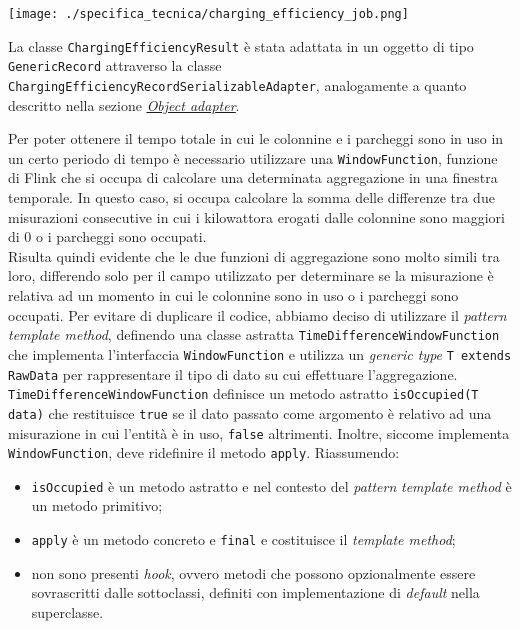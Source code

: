 \begin{center}
	\texttt{[image: ./specifica\_tecnica/charging\_efficiency\_job.png]}
\end{center}

La classe \texttt{ChargingEfficiencyResult} è stata adattata in un oggetto di tipo \texttt{GenericRecord} attraverso la classe \texttt{ChargingEfficiencyRecordSerializableAdapter},
analogamente a quanto descritto nella sezione \hyperref[object_adapter]{\underline{\textit{Object adapter}}}.

Per poter ottenere il tempo totale in cui le colonnine e i parcheggi sono in uso in un certo periodo di tempo è necessario utilizzare una \texttt{WindowFunction},
funzione di Flink che si occupa di calcolare una determinata aggregazione in una finestra temporale. In questo caso, si occupa calcolare la somma delle differenze
tra due misurazioni consecutive in cui i kilowattora erogati dalle colonnine sono maggiori di 0 o i parcheggi sono occupati.\\
Risulta quindi evidente che le due funzioni di aggregazione sono molto simili tra loro, differendo solo per il campo utilizzato per determinare se la misurazione
è relativa ad un momento in cui le colonnine sono in uso o i parcheggi sono occupati. Per evitare di duplicare il codice, abbiamo deciso di utilizzare il \textit{pattern}
\textit{template method}, definendo una classe astratta \texttt{TimeDifferenceWindowFunction} che implementa l'interfaccia \texttt{WindowFunction}
e utilizza un \textit{generic type} \texttt{T extends RawData} per rappresentare il tipo di dato su cui effettuare l'aggregazione.
\texttt{TimeDifferenceWindowFunction} definisce un metodo astratto \texttt{isOccupied(T data)} che restituisce \texttt{true} se il dato passato come argomento è relativo ad una misurazione in cui
l'entità è in uso, \texttt{false} altrimenti. Inoltre, siccome implementa \texttt{WindowFunction}, deve ridefinire il metodo \texttt{apply}.
Riassumendo:
\begin{itemize}
	\item \texttt{isOccupied} è un metodo astratto e nel contesto del \textit{pattern} \textit{template method} è un metodo primitivo;
	\item \texttt{apply} è un metodo concreto e \texttt{final} e costituisce il \textit{template method};
	\item non sono presenti \textit{hook}, ovvero metodi che possono opzionalmente essere sovrascritti dalle sottoclassi, definiti con implementazione di \textit{default} nella superclasse.
\end{itemize}

